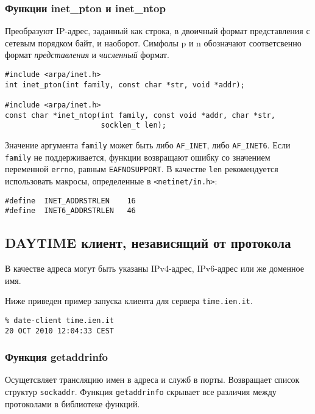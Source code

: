 \subsubsection{Функции inet\_pton и inet\_ntop}
Преобразуют IP-адрес, заданный как строка, в двоичный формат представления с сетевым порядком байт, и наоборот. Симфолы p и n обозначают соответсвенно формат \emph{представления} и \emph{численный} формат.
\lstset{language=C,caption=}
\begin{lstlisting}
#include <arpa/inet.h>
int inet_pton(int family, const char *str, void *addr);

#include <arpa/inet.h>
const char *inet_ntop(int family, const void *addr, char *str,
                      socklen_t len);
\end{lstlisting}

Значение аргумента \lstinline{family} может быть либо \lstinline{AF_INET}, либо \lstinline{AF_INET6}. Если \lstinline{family} не поддерживается, функции возвращают ошибку со значением переменной \lstinline{errno}, равным \lstinline{EAFNOSUPPORT}. В качестве \lstinline{len} рекомендуется использовать макросы, определенные в \lstinline{<netinet/in.h>}:
\lstset{language=C,caption=}
\begin{lstlisting}
#define  INET_ADDRSTRLEN    16
#define  INET6_ADDRSTRLEN   46
\end{lstlisting}

\subsection{DAYTIME клиент, независящий от протокола}
В качестве адреса могут быть указаны IPv4-адрес, IPv6-адрес или же доменное имя.

\lstset{label=lst:date-client,caption=DAYTIME клиент}


Ниже приведен пример запуска клиента для сервера \texttt{time.ien.it}.
\lstset{language=,label=lst:client-run,caption=Использование}
\begin{lstlisting}
% date-client time.ien.it
20 OCT 2010 12:04:33 CEST
\end{lstlisting}

\subsubsection{Функция getaddrinfo}
Осущетсвляет трансляцию имен в адреса и служб в порты. Возвращает список структур \lstinline{sockaddr}. Функция \lstinline{getaddrinfo} скрывает все различия между протоколами в библиотеке функций.

